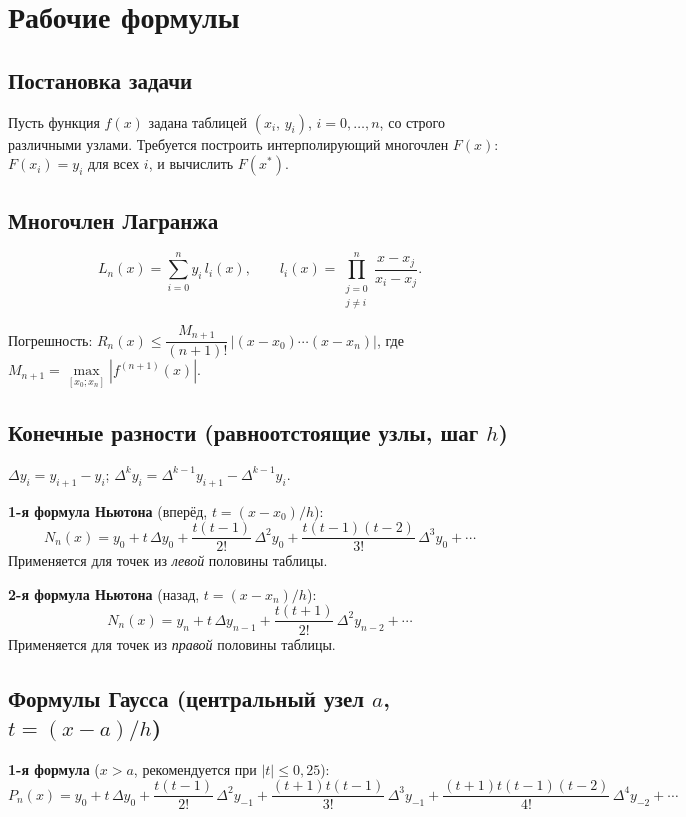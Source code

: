 \documentclass[a4paper,12pt]{article}
\begin{document}
\newpage
\section{Рабочие формулы}

\subsection{Постановка задачи}

Пусть функция $f(x)$ задана таблицей $(x_i,\,y_i)$, $i=0,\ldots,n$,
со строго различными узлами. Требуется построить интерполирующий многочлен
$F(x)$: $F(x_i)=y_i$ для всех $i$, и вычислить $F(x^{*})$.

\subsection{Многочлен Лагранжа}

\[
  L_n(x) = \sum_{i=0}^{n} y_i\,l_i(x),\qquad
  l_i(x) = \prod_{\substack{j=0\\j\neq i}}^{n}\frac{x-x_j}{x_i-x_j}.
\]

Погрешность: $R_n(x)\le\dfrac{M_{n+1}}{(n+1)!}\,|(x-x_0)\cdots(x-x_n)|$,
где $M_{n+1}=\max\limits_{[x_0;x_n]}|f^{(n+1)}(x)|$.

\subsection{Конечные разности (равноотстоящие узлы, шаг $h$)}

$\Delta y_i=y_{i+1}-y_i$;\quad
$\Delta^k y_i=\Delta^{k-1}y_{i+1}-\Delta^{k-1}y_i$.

\textbf{1-я формула Ньютона} (вперёд, $t=(x-x_0)/h$):
\[
  N_n(x)=y_0+t\,\Delta y_0+\frac{t(t-1)}{2!}\,\Delta^2 y_0
  +\frac{t(t-1)(t-2)}{3!}\,\Delta^3 y_0+\cdots
\]
Применяется для точек из \emph{левой} половины таблицы.

\textbf{2-я формула Ньютона} (назад, $t=(x-x_n)/h$):
\[
  N_n(x)=y_n+t\,\Delta y_{n-1}+\frac{t(t+1)}{2!}\,\Delta^2 y_{n-2}+\cdots
\]
Применяется для точек из \emph{правой} половины таблицы.

\subsection{Формулы Гаусса (центральный узел $a$, $t=(x-a)/h$)}

\textbf{1-я формула} ($x>a$, рекомендуется при $|t|\le0{,}25$):
\[
  P_n(x)=y_0+t\,\Delta y_0+\frac{t(t-1)}{2!}\,\Delta^2 y_{-1}
  +\frac{(t+1)t(t-1)}{3!}\,\Delta^3 y_{-1}
  +\frac{(t+1)t(t-1)(t-2)}{4!}\,\Delta^4 y_{-2}+\cdots
\]
\end{document}
